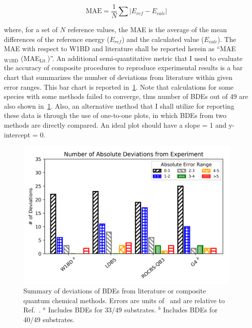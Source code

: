 \begin{equation}
  \mathrm{MAE} = \frac{1}{N} \sum | E_{ref} - E_{calc}|
\end{equation}

\noindent where, for a set of $N$ reference values, the MAE is the average of
the mean differences of the reference energy ($E_{ref}$) and the calculated
value ($E_{calc}$). The MAE with respect to W1BD and literature shall be
reported herein as ``MAE$_{\mathrm{W1BD}}$ (MAE$_{\mathrm{Lit.}}$)''. An
additional semi-quantitative metric that I used to evaluate the accuracy of
composite procedures to reproduce experimental results is a bar chart that
summarizes the number of deviations from literature within given error ranges.
This bar chart is reported in~\ref{fig:maebarchart}. Note that calculations for
some species with some methods failed to converge, thus number of BDEs out of
49 are also shown in~\ref{fig:maebarchart}. Also, an alternative method that I
shall utilize for reporting these data is through the use of one-to-one plots,
in which BDEs from two methods are directly compared. An ideal plot should have
a slope = 1 and y-intercept = 0.

\begin{figure}[!htbp]
  \centering
  \includegraphics[width=\textwidth]{figures/bde-barchart}
  \caption[Summary of deviations of BDEs from literature for composite quantum
  chemical methods.]{Summary of deviations of BDEs from literature or composite
  quantum chemical methods. Errors are units of \kcalmol\ and are relative to
  Ref.~\protect{}. $^a$ Includes BDEs for 33/49 substrates. $^b$
  Includes BDEs for 40/49 substrates.} \label{fig:maebarchart}
\end{figure}

